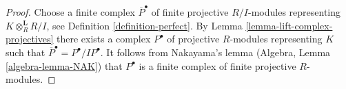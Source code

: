 \documentclass[10pt,a4paper]{amsart}
\theoremstyle{plain}
\theoremstyle{definition}
\theoremstyle{remark}
\numberwithin{equation}{subsection}
\begin{document}
\begin{proof}
Choose a finite complex $\overline{P}^\bullet$ of finite projective
$R/I$-modules representing $K \otimes_R^\mathbf{L} R/I$, see
Definition \ref{definition-perfect}. By
Lemma \ref{lemma-lift-complex-projectives}
there exists a complex $P^\bullet$ of projective $R$-modules
representing $K$ such that $\overline{P}^\bullet = P^\bullet/IP^\bullet$.
It follows from Nakayama's lemma (Algebra, Lemma \ref{algebra-lemma-NAK})
that $P^\bullet$ is a finite complex of finite projective
$R$-modules.
\end{proof}
\end{document}
